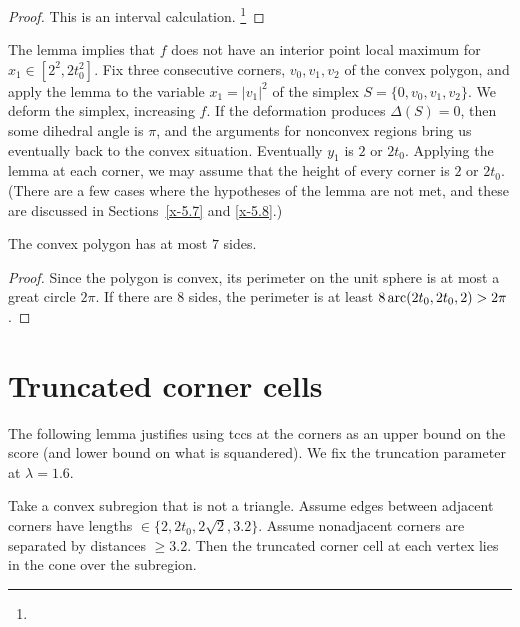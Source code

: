 \begin{proof} This is an interval calculation.%
\footnote{} %
\end{proof}

The lemma implies that $f$ does not have an interior point local maximum
for $x_1\in[2^2,2t_0^2]$.  Fix three consecutive corners, $v_0,v_1,v_2$
of the convex polygon, and apply the lemma to the variable $x_1 =
|v_1|^2$ of the simplex $S=\{0,v_0,v_1,v_2\}$. We deform the simplex,
increasing $f$.  If the deformation produces $\Delta(S)=0$, then some
dihedral angle is $\pi$, and the arguments for nonconvex regions bring
us eventually back to the convex situation. Eventually $y_1$ is $2$ or
$2t_0$.  Applying the lemma at each corner, we may assume that the
height of every corner is $2$ or $2t_0$.   (There are a few cases where
the hypotheses of the lemma are not met, and these are discussed in
Sections~\ref{x-5.7} and \ref{x-5.8}.)

\begin{lemma}
    \label{lemma:7-sides}
The convex polygon has at most $7$ sides.
\end{lemma}

\begin{proof}
Since the polygon is convex, its perimeter on the unit sphere is at most
a great circle $2\pi$.  If there are $8$ sides, the perimeter is at
least $8\operatorname{arc}(2t_0,2t_0,2)>2\pi$.
\end{proof}

\section{Truncated corner cells}

The following lemma justifies using tccs at the corners as an upper
bound on the score (and lower bound on what is squandered). We fix the
truncation parameter at $\lambda=1.6$.

\begin{lemma}
Take a convex subregion that is not a triangle.  Assume edges between
adjacent corners have lengths $\in\{2,2t_0,2\sqrt{2},3.2\}$. Assume
nonadjacent corners are separated by distances $\ge3.2$.  Then the
truncated corner cell at each vertex lies in the cone over the
subregion.
\end{lemma}

